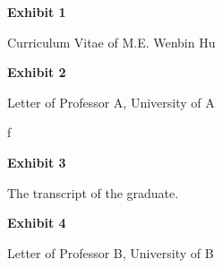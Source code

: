 \documentclass{article}
\begin{document}
\clearpage

\vspace*{\fill}
\begin{center}

{\LARGE \bf
Exhibit 1
}

\vspace{10\baselineskip}

{\large Curriculum Vitae of M.E. Wenbin Hu}

\end{center}
\vspace*{\fill}

% 

\vspace*{\fill}
\begin{center}

{\LARGE \bf
Exhibit 2
}

\vspace{10\baselineskip}

{\large Letter of Professor A, University of A}

\end{center}
\vspace*{\fill}
f
% 

\vspace*{\fill}
\begin{center}

{\LARGE \bf
Exhibit 3
}

\vspace{10\baselineskip}

{\large The transcript of the graduate.}

\end{center}
\vspace*{\fill}

 


\vspace*{\fill}
\begin{center}

{\LARGE \bf
Exhibit 4
}

\vspace{10\baselineskip}

{\large Letter of Professor B, University of B}

\end{center}
\vspace*{\fill}
\end{document}
